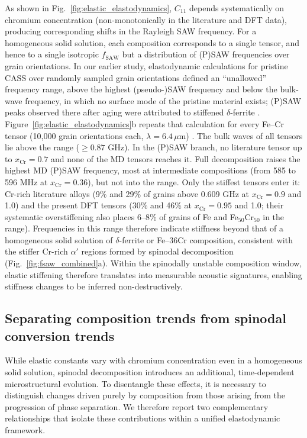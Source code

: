 \documentclass[final,3p,times]{elsarticle}
\begin{document}
As shown in Fig.~\ref{fig:elastic_elastodynamics}, $C_{11}$ depends systematically on chromium concentration (non-monotonically in the literature and DFT data), producing corresponding shifts in the Rayleigh SAW frequency. For a homogeneous solid solution, each composition corresponds to a single tensor, and hence to a single isotropic $f_{\mathrm{SAW}}$ but a distribution of (P)SAW frequencies over grain orientations. In our earlier study, elastodynamic calculations for pristine CASS over randomly sampled grain orientations defined an ``unallowed'' frequency range, above the highest (pseudo-)SAW frequency and below the bulk-wave frequency, in which no surface mode of the pristine material exists; (P)SAW peaks observed there after aging were attributed to stiffened $\delta$-ferrite \cite{al2023detecting}. Figure~\ref{fig:elastic_elastodynamics}b repeats that calculation for every Fe--Cr tensor (10{,}000 grain orientations each, $\lambda=6.4\,\mu$m) \cite{du2017facile}. The bulk waves of all tensors lie above the range ($\geq0.87$ GHz). In the (P)SAW branch, no literature tensor up to $x_{\mathrm{Cr}}=0.7$ and none of the MD tensors reaches it. Full decomposition raises the highest MD (P)SAW frequency, most at intermediate compositions (from 585 to 596 MHz at $x_{\mathrm{Cr}}=0.36$), but not into the range. Only the stiffest tensors enter it: Cr-rich literature alloys (9\% and 29\% of grains above 0.609 GHz at $x_{\mathrm{Cr}}=0.9$ and 1.0) and the present DFT tensors (30\% and 46\% at $x_{\mathrm{Cr}}=0.95$ and 1.0; their systematic overstiffening also places 6--8\% of grains of Fe and Fe$_{50}$Cr$_{50}$ in the range). Frequencies in this range therefore indicate stiffness beyond that of a homogeneous solid solution of $\delta$-ferrite or Fe--36Cr composition, consistent with the stiffer Cr-rich $\alpha'$ regions formed by spinodal decomposition (Fig.~\ref{fig:fsaw_combined}a). Within the spinodally unstable composition window, elastic stiffening therefore translates into measurable acoustic signatures, enabling stiffness changes to be inferred non-destructively.

\subsection{Separating composition trends from spinodal conversion trends}

While elastic constants vary with chromium concentration even in a homogeneous solid solution, spinodal decomposition introduces an additional, time-dependent microstructural evolution. To disentangle these effects, it is necessary to distinguish changes driven purely by composition from those arising from the progression of phase separation. We therefore report two complementary relationships that isolate these contributions within a unified elastodynamic framework.
\end{document}
